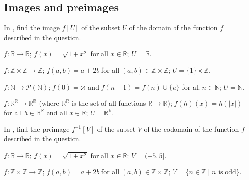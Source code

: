 \subsection*{Images and preimages}

In , find the image $f[U]$ of the subset $U$ of the domain of the function $f$ described in the question.

\begin{chapex}
\label{cqComputeImageBegin}
$f : \mathbb{R} \to \mathbb{R}$; $f(x) = \sqrt{1+x^2}$ for all $x \in \mathbb{R}$; $U = \mathbb{R}$.
\end{chapex}

\begin{chapex}
$f : \mathbb{Z} \times \mathbb{Z} \to \mathbb{Z}$; $f(a,b) = a+2b$ for all $(a,b) \in \mathbb{Z} \times \mathbb{Z}$; $U = \{ 1 \} \times \mathbb{Z}$.
\end{chapex}

\begin{chapex}
$f : \mathbb{N} \to \mathcal{P}(\mathbb{N})$; $f(0) = \varnothing$ and $f(n+1) = f(n) \cup \{ n \}$ for all $n \in \mathbb{N}$; $U = \mathbb{N}$.
\end{chapex}

\begin{chapex}
\label{cqComputeImageEnd}
$f : \mathbb{R}^{\mathbb{R}} \to \mathbb{R}^{\mathbb{R}}$ (where $\mathbb{R}^{\mathbb{R}}$ is the set of all functions $\mathbb{R} \to \mathbb{R}$); $f(h)(x) = h(|x|)$ for all $h \in \mathbb{R}^{\mathbb{R}}$ and all $x \in \mathbb{R}$; $U = \mathbb{R}^{\mathbb{R}}$.
\end{chapex}

In , find the preimage $f^{-1}[V]$ of the subset $V$ of the codomain of the function $f$ described in the question.

\begin{chapex}
\label{cqComputePreimageBegin}
$f : \mathbb{R} \to \mathbb{R}$; $f(x) = \sqrt{1+x^2}$ for all $x \in \mathbb{R}$; $V = (-5,5]$.
\end{chapex}

\begin{chapex}
$f : \mathbb{Z} \times \mathbb{Z} \to \mathbb{Z}$; $f(a,b) = a+2b$ for all $(a,b) \in \mathbb{Z} \times \mathbb{Z}$; $V = \{ n \in \mathbb{Z} \mid n \text{ is odd} \}$.
\end{chapex}


